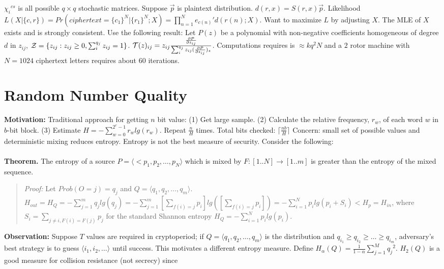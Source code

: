 ${\chi_i}^{cs}$ is all possible $q \times q$ stochastic matrices.  Suppose
${\vec p}$ is plaintext distribution.
$d(r, x)= S(r,x) {\vec p}$.  Likelihood $L(X | \{c, r \}) =
Pr(ciphertext= \{c_1\}^N | \{r_1\}^N; X)= \prod_{n=1}^N {e_{c(n)}}' d(r(n); X)$.  
Want to maximize $L$ by adjusting $X$.  The MLE of $X$ exists and is strongly consistent.
Use the following result:  Let $P(z)$ be a polynomial with non-negative coefficients
homogeneous of degree $d$ in $z_{ij}$, ${\cal Z}= \{ z_{ij}: z_{ij} \ge 0,
\sum_i^{q_j} z_{ij} =1 \}$.  ${\cal T}(z)_{ij}= z_{ij} 
{\frac {\frac {\partial P} {\partial {z_{ij}}}}
{\sum_i^{q_j} z_{ij} ({\frac {\partial P} {\partial {z_{ij}}}})_z}}$.  Computations
requires is
$\approx k q^2 N$ and a $2$ rotor machine with $N=1024$ ciphertext letters requires about
$60$ iterations.
\section{Random Number Quality}
{\bf Motivation:}
Traditional approach for getting $n$ bit value:
(1) Get large sample. (2)
Calculate the relative frequency, $r_w$, of each word $w$ in $b$-bit block.
(3) Estimate $H= - \sum_{w=0}^{2^r-1} r_w lg(r_w)$.
Repeat ${\frac n H}$ times.  Total bits checked: $\lceil {\frac {nb} H} \rceil$
Concern: small set of possible values and deterministic mixing reduces entropy.
Entropy is not the best measure of security.  Consider the following:
\\
\\
{\bf Theorem.}  The entropy of a source $P= \langle <p_1 ,p_2 , \ldots , p_N \rangle$ 
which is mixed
by $F: [1..N] \rightarrow [1..m]$ is greater than the entropy of the mixed sequence.
\begin{quote}
\emph{Proof:}
Let $Prob(O=j)= q_j$ and $Q=  \langle q_1, q_2, \ldots, q_m \rangle$.
$H_{out}=H_Q
= - \sum_{j=1}^m q_j lg(q_j)
= - \sum_{j=1}^m [\sum_{f(i)=j} p_i] lg([\sum_{f(i)=j} p_i])
= - \sum_{i=1}^N p_i lg(p_i + S_i)<H_p=H_{in}$, where $S_i= \sum_{j \ne i, F(i)=F(j)} p_j$ 
for the standard Shannon entropy $H_Q= - \sum_{i=1}^N p_i lg(p_i)$.
\end{quote}
{\bf Observation:}
Suppose $T$ values are required in cryptoperiod;
if $Q= \langle q_1 , q_2 , \ldots , q_m \rangle$ is the distribution and
$q_{i_1} \ge q_{i_2} \ge \ldots \ge q_{i_m}$, adversary's best strategy
is to guess $\langle i_1, i_2, \ldots \rangle$ until success.  
This motivates a different entropy measure.
Define $H_{\alpha}(Q)= {\frac 1 {1- \alpha}} \sum_{j=1}^M {q_j}^2$.  
$H_2(Q)$ is a good measure for collision resistance (not secrecy) since
